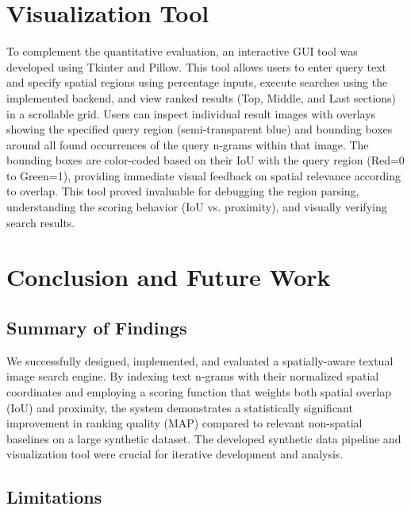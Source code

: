 \documentclass[manuscript,screen]{acmart}
\begin{document}
\section{Visualization Tool}

To complement the quantitative evaluation, an interactive GUI tool was developed using Tkinter and Pillow. This tool allows users to enter query text and specify spatial regions using percentage inputs, execute searches using the implemented backend, and view ranked results (Top, Middle, and Last sections) in a scrollable grid. Users can inspect individual result images with overlays showing the specified query region (semi-transparent blue) and bounding boxes around all found occurrences of the query n-grams within that image. The bounding boxes are color-coded based on their IoU with the query region (Red=0 to Green=1), providing immediate visual feedback on spatial relevance according to overlap. This tool proved invaluable for debugging the region parsing, understanding the scoring behavior (IoU vs. proximity), and visually verifying search results.

\section{Conclusion and Future Work}

\subsection{Summary of Findings}

We successfully designed, implemented, and evaluated a spatially-aware textual image search engine. By indexing text n-grams with their normalized spatial coordinates and employing a scoring function that weights both spatial overlap (IoU) and proximity, the system demonstrates a statistically significant improvement in ranking quality (MAP) compared to relevant non-spatial baselines on a large synthetic dataset. The developed synthetic data pipeline and visualization tool were crucial for iterative development and analysis.

\subsection{Limitations}
\end{document}
